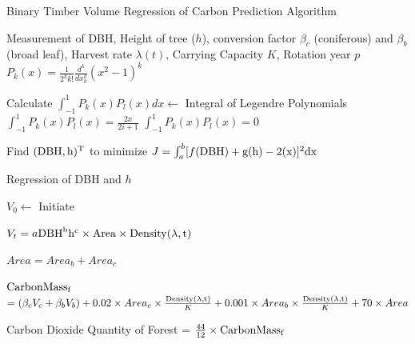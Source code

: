\documentclass{mcmthesis}
\numberwithin{figure}{section}
\numberwithin{table}{section}
\numberwithin{equation}{section}
\begin{document}
\begin{algorithm}[htbp]
    \caption{Binary Timber Volume Regression of Carbon Prediction Algorithm}\label{Binary Volume Algo}
    \begin{algorithmic}[1]
      \Require
        Measurement of DBH, Height of tree ($ h $), conversion factor 
        $ \beta_c $  (coniferous) and $ \beta_b $ (broad leaf), Harvest rate $ \lambda(t) $, Carrying Capacity $ K $,
        Rotation year $ p $   
        $ P_k(x) = \frac{1}{2^kk!}\frac{d^k}{dx_k^k}(x^2-1)^k $

        \quad \quad Calculate $ \int_{-1}^{1}P_k(x)P_l(x)dx \gets $ Integral of Legendre Polynomials
        $ \int_{-1}^1P_k(x)P_l(x) = \frac{2x}{2i+1} $
        \Else $ \int_{-1}^1P_k(x)P_l(x) = 0 $   
        \EndIf 
        \EndFor
        \EndFor
        \EndFor
        
        \noindent Find $ (\rm{DBH}, h)^T $ to minimize  $ J = \int_a^b[f(\rm{DBH})+g(h)-2(x)]^2dx $


        Regression of DBH and $ h $  

        $V_0 \gets$ Initiate

        $ V_t = a\rm{DBH}^bh^c\times Area\times \rm{Density}(\lambda, t)  $
        \EndIf
        \EndFor

        \noindent$ Area = Area_b + Area_c $

        \noindent $ \rm{CarbonMass_f} $  $= (\beta_cV_c+\beta_bV_b)+0.02\times Area_c\times 
        \frac{\rm{Density}(\lambda,t)}{K}+0.001\times Area_b \times \frac{\rm{Density}(\lambda,t)}{K}+ 70\times Area$

        \Ensure
        Carbon Dioxide Quantity of Forest = $\frac{44}{12}\times\rm{CarbonMass_f}$ 
    \end{algorithmic}
  \end{algorithm}
  
\end{document}
